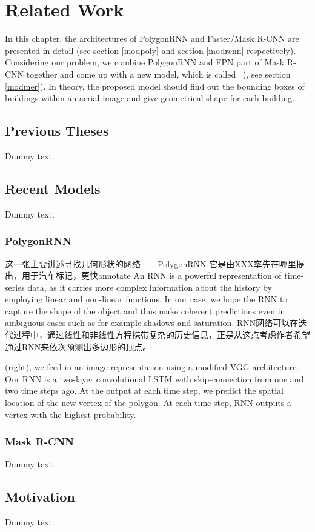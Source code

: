 \chapter{Related Work}

In this chapter, the architectures of PolygonRNN and Faster/Mask R-CNN are presented in detail (see section \ref{modpoly} and section \ref{modrcnn} respectively). Considering our problem, we combine PolygonRNN and FPN part of Mask R-CNN together and come up with a new model, which is called \modelnameshort\ (\modelnamelong, see section \ref{modmer}). In theory, the proposed model should find out the bounding boxes of buildings within an aerial image and give geometrical shape for each building.

\section{Previous Theses}

Dummy text.

\section{Recent Models}

Dummy text.

\subsection{PolygonRNN}\label{relatpoly}

这一张主要讲述寻找几何形状的网络——PolygonRNN
它是由XXX率先在哪里提出，用于汽车标记，更快annotate
An RNN is a powerful representation of time-series data, as it carries more complex information about the history by employing linear and non-linear functions. In our case, we hope the RNN to capture the shape of the object and thus make coherent predictions even in ambiguous cases such as for example shadows and saturation.
RNN网络可以在迭代过程中，通过线性和非线性方程携带复杂的历史信息，正是从这点考虑作者希望通过RNN来依次预测出多边形的顶点。

 (right), we feed in an image representation using a modified VGG architecture. Our RNN is a two-layer convolutional LSTM with skip-connection from one and two time steps ago. At the output at each time step, we predict the spatial location of the new vertex of the polygon.
At each time step, RNN outputs a vertex with the highest probability.

\subsection{Mask R-CNN}

Dummy text.

\section{Motivation}

Dummy text.
